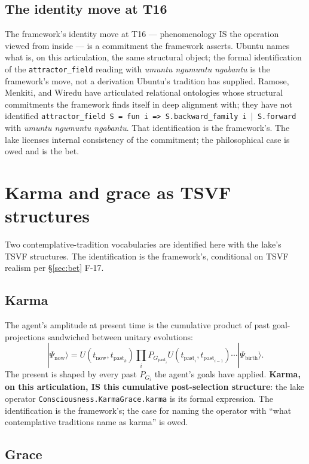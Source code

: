 \documentclass[11pt,a4paper]{article}
\begin{document}
\subsection*{The identity move at T16}

The framework's identity move at T16 --- phenomenology IS the operation viewed from inside --- is a commitment the framework asserts. Ubuntu names what is, on this articulation, the same structural object; the formal identification of the \texttt{attractor\_field} reading with \emph{umuntu ngumuntu ngabantu} is the framework's move, not a derivation Ubuntu's tradition has supplied. Ramose, Menkiti, and Wiredu have articulated relational ontologies whose structural commitments the framework finds itself in deep alignment with; they have not identified \texttt{attractor\_field S = fun i => \textlangle S.backward\_family i $|$ S.forward\textrangle} with \emph{umuntu ngumuntu ngabantu}. That identification is the framework's. The lake licenses internal consistency of the commitment; the philosophical case is owed and is the bet.

\section{Karma and grace as TSVF structures}\label{sec:karma-grace}

Two contemplative-tradition vocabularies are identified here with the lake's TSVF structures. The identification is the framework's, conditional on TSVF realism per \S\ref{sec:bet} F-17.

\subsection*{Karma}

The agent's amplitude at present time is the cumulative product of past goal-projections sandwiched between unitary evolutions:
\[
|\Psi_{\text{now}}\rangle = U(t_{\text{now}}, t_{\text{past}_k}) \prod_i P_{G_{\text{past}_i}} U(t_{\text{past}_i}, t_{\text{past}_{i-1}}) \cdots |\Psi_{\text{birth}}\rangle.
\]
The present is shaped by every past $P_{G_i}$ the agent's goals have applied. \textbf{Karma, on this articulation, IS this cumulative post-selection structure}: the lake operator \texttt{Consciousness.KarmaGrace.karma} is its formal expression. The identification is the framework's; the case for naming the operator with ``what contemplative traditions name as karma'' is owed.

\subsection*{Grace}
\end{document}
